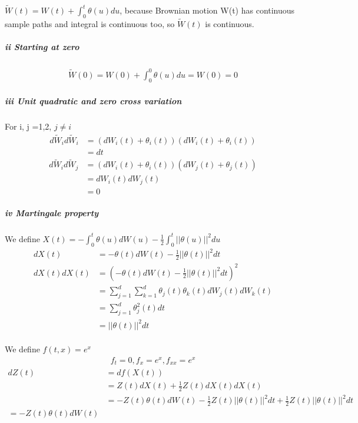 \documentclass{article}
\begin{document}
\paragraph{}{$\tilde{W}(t)=W(t)+\int_{0}^{t}\theta(u)du$, because Brownian motion W(t) has continuous sample paths and integral is continuous too, so $\tilde{W}(t)$ is continuous.}
\subparagraph{ii Starting at zero}
\begin{align*}
  \tilde{W}(0)=W(0)+\int_{0}^{0}\theta(u)du=W(0)=0
\end{align*}
\subparagraph{iii Unit quadratic and zero cross variation}
\paragraph{}{For i, j =1,2, $j\neq i$}
\begin{align*}
  d\tilde{W}_{i} d\tilde{W}_{i}& = (dW_i(t)+\theta_i(t))(dW_i(t)+\theta_i(t))\\
   & =dt
\end{align*}
\begin{align*}
  d\tilde{W}_{i} d\tilde{W}_{j}& = (dW_i(t)+\theta_i(t))(dW_j(t)+\theta_j(t))\\
   & =dW_i(t)dW_j(t)\\&=0
\end{align*}
\subparagraph{iv Martingale property}
\paragraph{}{We define $X(t)=-\int_{0}^{t}\theta(u)dW(u)-\frac{1}{2}\int_{0}^{t}||\theta(u)||^2du$}
\begin{align*}
  dX(t) &= -\theta(t)dW(t)-\frac{1}{2}||\theta(t)||^2dt \\
  dX(t)dX(t) & = (-\theta(t)dW(t)-\frac{1}{2}||\theta(t)||^2dt)^2\\
  &=\sum_{j=1}^{d}\sum_{k=1}^{d}\theta_j(t)\theta_k(t)dW_j(t)dW_k(t)\\
  &=\sum_{j=1}^{d}\theta^2_j(t)dt\\
  &=||\theta(t)||^2dt
\end{align*}
\paragraph{}{We define $f(t,x)=e^x$}
\begin{align*}
  f_t=0, f_x=e^x, f_{xx}=e^x
\end{align*}
\begin{align*}
  dZ(t) & =df(X(t)) \\
   & =Z(t)dX(t)+\frac{1}{2}Z(t)dX(t)dX(t) \\
   & =-Z(t)\theta(t)dW(t)-\frac{1}{2}Z(t)||\theta(t)||^2dt+\frac{1}{2}Z(t)||\theta(t)||^2dt\\
   =-Z(t)\theta(t)dW(t)
\end{align*}
\end{document}
